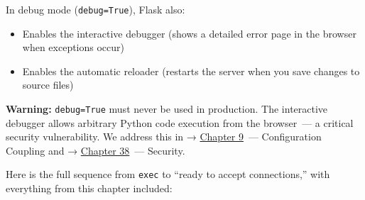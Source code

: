 \noindent{}In debug mode (\texttt{debug=True}), Flask also:

\begin{itemize}
\tightlist
\item
  Enables the interactive debugger (shows a detailed error page in the browser when exceptions occur)
\item
  Enables the automatic reloader (restarts the server when you save changes to source files)
\end{itemize}

\begin{warnbox}

\textbf{Warning:} \texttt{debug=True} must never be used in production. The interactive debugger allows arbitrary Python code execution from the browser~--- a critical security vulnerability. We address this in → \hyperref[ch:09-configuration-coupling]{Chapter 9}~--- Configuration Coupling and → \hyperref[ch:38-security]{Chapter 38}~--- Security.

\end{warnbox}

\label{02-runtime-initialization:the-complete-initialization-timeline}

Here is the full sequence from \texttt{exec} to ``ready to accept connections,'' with everything from this chapter included:

